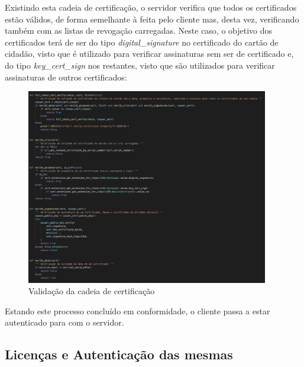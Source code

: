 \documentclass[10pt,english]{article}
\begin{document}
\par Existindo esta cadeia de certificação, o servidor verifica que todos os certificados estão válidos, de forma semelhante à feita pelo cliente mas, desta vez, verificando também com as listas de revogação carregadas. Neste caso, o objetivo dos certificados terá de ser do tipo \textit{digital\_signature} no certificado do cartão de cidadão, visto que é utilizado para verificar assinaturas sem ser de certificado e, do tipo \textit{key\_cert\_sign} nos restantes, visto que são utilizados para verificar assinaturas de outros certificados:

\begin{figure}[!h]
        \centering
        \includegraphics[width=400]{images/chain_verify_server.png}
        \caption{Validação da cadeia de certificação}
\end{figure}

\par Estando este processo concluído em conformidade, o cliente passa a estar autenticado para com o servidor.

\clearpage

\subsection{Licenças e Autenticação das mesmas}
\end{document}

